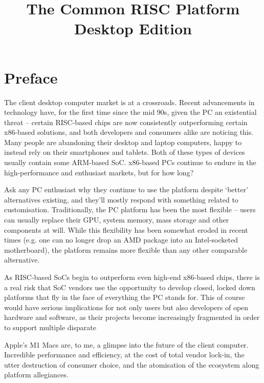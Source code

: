 \documentclass[12pt]{report}
\title{The Common RISC Platform\\ \large{Desktop Edition}}
\begin{document}
\maketitle

\newpage

\tableofcontents
\newpage

\section{Preface}
The client desktop computer market is at a crossroads. Recent advancements in technology have, for the first time since
the mid 90s, given the PC an existential threat -- certain RISC-based chips are now consistently outperforming certain
x86-based solutions, and both developers and consumers alike are noticing this. Many people are abandoning their desktop
and laptop computers, happy to instead rely on their smartphones and tablets. Both of these types of devices usually contain
some ARM-based SoC. x86-based PCs continue to endure in the high-performance and enthusiast markets, but for how long?

Ask any PC enthusiast why they continue to use the platform despite `better' alternatives existing, and they'll mostly
respond with something related to customisation. Traditionally, the PC platform has been the most flexible -- users can
usually replace their GPU, system memory, mass storage and other components at will. While this flexibility has been somewhat
eroded in recent times (e.g. one can no longer drop an AMD package into an Intel-socketed motherboard), the platform
remains more flexible than any other comparable alternative.

As RISC-based SoCs begin to outperform even high-end x86-based chips, there is a real risk that SoC vendors use the opportunity
to develop closed, locked down platforms that fly in the face of everything the PC stands for. This of course would have serious
implications for not only users but also developers of open hardware and software, as their projects become increasingly fragmented
in order to support multiple disparate

Apple's M1 Macs are, to me, a glimpse into the future of the client computer. Incredible performance and efficiency, at
the cost of total vendor lock-in, the utter destruction of consumer choice, and the atomisation of the ecosystem along platform
allegiances.
\end{document}
